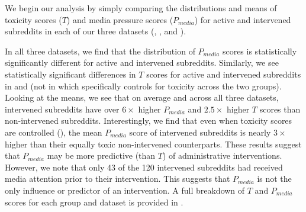 


 We
begin our analysis by simply comparing the distributions and means of toxicity
scores ($T$) and media pressure scores ($P_{media}$) for active and intervened
subreddits in each of our three datasets (, , and ). 

 In all three
datasets, we find that the distribution of $P_{media}$ scores is statistically
significantly different for active and intervened subreddits. Similarly, we see
statistically significant differences in $T$ scores for active and intervened
subreddits in  and  (not in  which specifically controls for
toxicity across the two groups). Looking at the means, we see that on average
and across all three datasets, intervened subreddits have over $6\times$ higher
$P_{media}$ and $2.5\times$ higher $T$ scores than non-intervened subreddits.
Interestingly, we find that even when toxicity scores are controlled (),
the mean $P_{media}$ score of intervened subreddits is nearly $3\times$ higher
than their equally toxic non-intervened counterparts. These results suggest
that $P_{media}$ may be more predictive (than $T$) of administrative
interventions. However, we note that only 43 of the 120
intervened subreddits had received media attention prior to their intervention.
This suggests that $P_{media}$ is not the only influence or predictor of an
intervention. A full breakdown of $T$ and $P_{media}$ scores for each group and
dataset is provided in .


